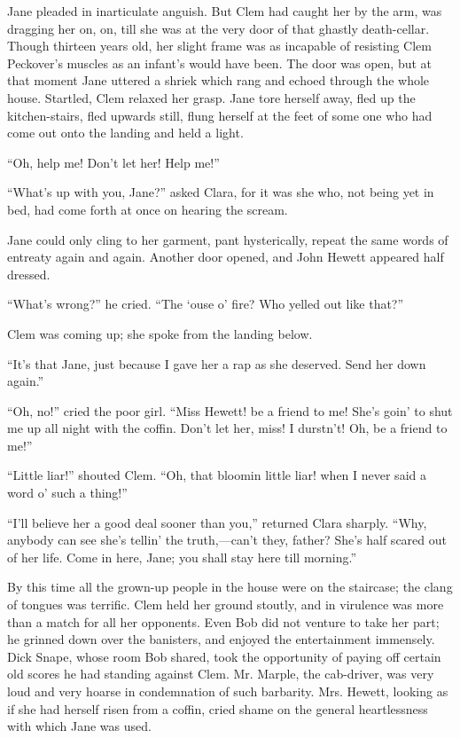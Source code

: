 Jane pleaded in inarticulate anguish. But Clem had caught her by the
arm, was {\protect\hypertarget{88}{}{}}dragging her on, on, till she was
at the very door of that ghastly death-cellar. Though thirteen years
old, her slight frame was as incapable of resisting Clem Peckover's
muscles as an infant's would have been. The door was open, but at that
moment Jane uttered a shriek which rang and echoed through the whole
house. Startled, Clem relaxed her grasp. Jane tore herself away, fled up
the kitchen-stairs, fled upwards still, flung herself at the feet of
some one who had come out onto the landing and held a light.

``Oh, help me! Don't let her! Help me!''

``What's up with you, Jane?'' asked Clara, for it was she who, not being
yet in bed, had come forth at once on hearing the scream.

Jane could only cling to her garment, pant hysterically, repeat the same
words of entreaty again and again. Another door opened, and John Hewett
appeared half dressed.

``What's wrong?'' he cried. ``The `ouse o' fire? Who yelled out like
that?''

Clem was coming up; she spoke from the landing below.

{\protect\hypertarget{89}{}{}}``It's that Jane, just because I gave her
a rap as she deserved. Send her down again.''

``Oh, no!'' cried the poor girl. ``Miss Hewett! be a friend to me! She's
goin' to shut me up all night with the coffin. Don't let her, miss! I
durstn't! Oh, be a friend to me!''

``Little liar!'' shouted Clem. ``Oh, that bloomin little liar! when I
never said a word o' such a thing!''

``I'll believe her a good deal sooner than you,'' returned Clara
sharply. ``Why, anybody can see she's tellin' the truth,---can't they,
father? She's half scared out of her life. Come in here, Jane; you shall
stay here till morning.''

By this time all the grown-up people in the house were on the staircase;
the clang of tongues was terrific. Clem held her ground stoutly, and in
virulence was more than a match for all her opponents. Even Bob did not
venture to take her part; he grinned down over the banisters, and
enjoyed the entertainment immensely. Dick Snape, whose
{\protect\hypertarget{90}{}{}}room Bob shared, took the opportunity of
paying off certain old scores he had standing against Clem. Mr. Marple,
the cab-driver, was very loud and very hoarse in condemnation of such
barbarity. Mrs. Hewett, looking as if she had herself risen from a
coffin, cried shame on the general heartlessness with which Jane was
used.

